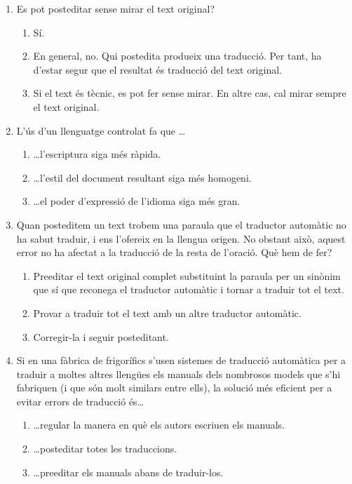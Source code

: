 \begin{enumerate}
\item Es pot posteditar sense mirar el text original?
  \begin{enumerate}
  \item Sí.
  \item En general, no. Qui postedita produeix una traducció. Per
    tant, ha d'estar segur que el resultat és traducció del text
    original.
  \item Si el text és tècnic, es pot fer sense mirar. En altre cas, cal
    mirar sempre el text original.
  \end{enumerate}

\item L'ús d'un llenguatge controlat fa que \ldots
  \begin{enumerate}
  \item \ldots l'escriptura siga més ràpida.
  \item \ldots l'estil del document resultant siga més homogeni.
  \item \ldots el poder d'expressió de l'idioma siga més gran.
  \end{enumerate}

\item Quan posteditem un text trobem una paraula que el traductor
  automàtic no ha sabut traduir, i ens l'ofereix en la llengua
  origen. No obstant això, aquest error no ha afectat a la traducció
  de la resta de l'oració. Què hem de fer?
  \begin{enumerate}
  \item Preeditar el text original complet substituint la paraula per
    un sinònim que sí que reconega el traductor automàtic i tornar a
    traduir tot el text.
  \item Provar a traduir tot el text amb un altre traductor automàtic.
  \item Corregir-la i seguir posteditant.
  \end{enumerate}

\item Si en una fàbrica de frigorífics s'usen sistemes de traducció
  automàtica per a traduir a moltes altres llengües els manuals dels
  nombrosos models que s'hi fabriquen (i que són molt similars entre
  ells), la solució més eficient per a evitar errors de traducció
  és{\ldots}
  \begin{enumerate}
  \item \ldots regular la manera en què els autors escriuen els
    manuals.
  \item \ldots posteditar totes les traduccions.
  \item \ldots preeditar els manuals abans de traduir-los.
  \end{enumerate}


\end{enumerate}
